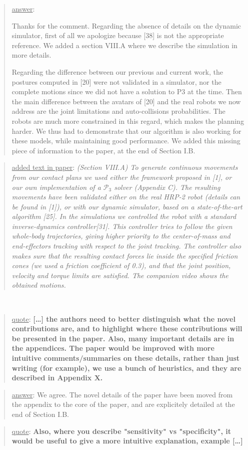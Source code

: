 \documentclass[a4paper]{article}
\newcommand{\done}[0]{}
\newcommand\quot[1]{\begin{quote} \underline{quote}: \textbf{#1}\end{quote}}
\newcommand\as[1]{\begin{quote} \underline{answer}: {#1}\end{quote} }
\newcommand\qt[1]{\begin{quote} \underline{added text in paper}: \textit{#1}\end{quote} \leavevmode \\ }
\begin{document}
\as{Thanks for the comment. Regarding the absence of details on the dynamic simulator, first of all we apologize because [38] is not the appropriate reference.
We added a section VIII.A where we describe the simulation in more details. 

Regarding the difference between our previous and current work, the postures computed in [20] were not validated in a simulator, nor the complete motions since 
we did not have a solution to P3 at the time. Then the main
difference between the avatars of [20] and the real robots we now address are the joint limitations and auto-collisions probabilities.
The robots are much more constrained in this regard, which makes the planning harder. We thus had to demonstrate that our algorithm is also working
for these models, while maintaining good performance.
We added this missing piece of information to the paper, at the end of Section I.B.}
\qt{(Section VIII.A) To generate continuous movements from our contact plans we used either the framework proposed in [1], or our own implementation of a $\mathcal{P}_3$ solver (Appendix C).
The resulting movements have been validated either on the real HRP-2 robot (details can be found in [1]), or with our dynamic simulator, based on a state-of-the-art algorithm [25].
In the simulations we controlled the robot with a standard inverse-dynamics controller[31].
This controller tries to follow the given whole-body trajectories, giving higher priority to the center-of-mass and end-effectors tracking with respect to the joint tracking.
The controller also makes sure that the resulting contact forces lie inside the specified friction cones (we used a friction coefficient of 0.3), and that the joint position, velocity and torque limits are satisfied.
The companion video shows the obtained motions.}
\done


\quot{[\dots] the authors need to better
distinguish what the novel contributions are, and to highlight where
these contributions will be presented in the paper.  Also, many
important details are in the appendices. The paper would be improved
with more intuitive comments/summaries on these details, rather than
just writing (for example), we use a bunch of heuristics, and they are
described in Appendix X.}

\as{We agree. The novel details of the paper have been moved from the appendix to the core of the paper, and are explicitely detailed at the end of Section I.B.} \done

\quot{
Also, where you describe "sensitivity" vs "specificity", it would be
useful to give a more intuitive explanation, example [\dots]}
\end{document}
